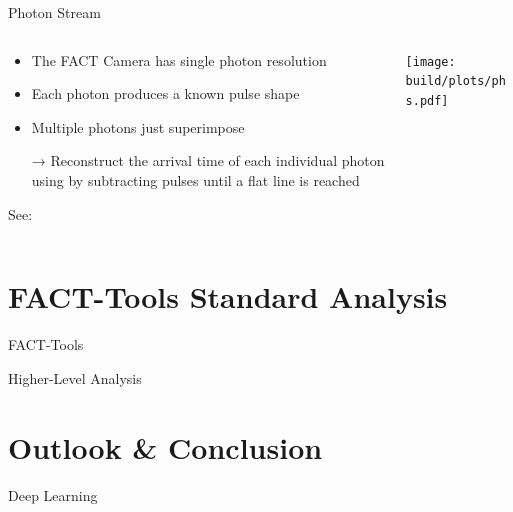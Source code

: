 \documentclass[compress, 9pt, aspectratio=1610, professionalfonts]{beamer}
\begin{document}
\begin{frame}[c]{Photon Stream}
  \begin{columns}[onlytextwidth]
    \begin{column}{0.475\textwidth}
      \begin{itemize}
        \item The FACT Camera has single photon resolution
        \item Each photon produces a known pulse shape 
        \item Multiple photons just superimpose
        \item[→] Reconstruct the arrival time of each individual photon using by subtracting pulses until a flat line is reached
      \end{itemize}
      \begin{center}
        \small See: \cite{photonstream}
      \end{center}
    \end{column}
    \begin{column}{0.475\textwidth}
      \texttt{[image: build/plots/phs.pdf]}
    \end{column}
  \end{columns}
\end{frame}

\section{FACT-Tools Standard Analysis}
\begin{frame}[t]{FACT-Tools}
\end{frame}

\begin{frame}[t]{Higher-Level Analysis}
\end{frame}

\section{Outlook \& Conclusion}

\begin{frame}[t]{Deep Learning}
\end{frame}
\end{document}
